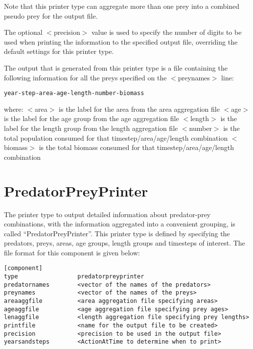 \documentclass[]{book}
\begin{document}
Note that this printer type can aggregate more than one prey into a
combined pseudo prey for the output file.

The optional \(<\)precision\(>\) value is used to specify the number of
digits to be used when printing the information to the specified output
file, overriding the default settings for this printer type.

The output that is generated from this printer type is a file containing
the following information for all the preys specified on the
\(<\)preynames\(>\) line:

\begin{verbatim}
year-step-area-age-length-number-biomass
\end{verbatim}

where: \(<\)area\(>\) is the label for the area from the area aggregation
file \(<\)age\(>\) is the label for the age group from the age aggregation
file \(<\)length\(>\) is the label for the length group from the length
aggregation file \(<\)number\(>\) is the total population consumed for that
timestep/area/age/length combination \(<\)biomass\(>\) is the total biomass
consumed for that timestep/area/age/length combination

\hypertarget{sec:predatorpreyprinter}{%
\section{PredatorPreyPrinter}\label{sec:predatorpreyprinter}}

The printer type to output detailed information about predator-prey
combinations, with the information aggregated into a convenient
grouping, is called ``PredatorPreyPrinter''. This printer type is defined
by specifying the predators, preys, areas, age groups, length groups and
timesteps of interest. The file format for this component is given
below:

\begin{verbatim}
[component]
type                 predatorpreyprinter
predatornames        <vector of the names of the predators>
preynames            <vector of the names of the preys>
areaaggfile          <area aggregation file specifying areas>
ageaggfile           <age aggregation file specifying prey ages>
lenaggfile           <length aggregation file specifying prey lengths>
printfile            <name for the output file to be created>
precision            <precision to be used in the output file>
yearsandsteps        <ActionAtTime to determine when to print>
\end{verbatim}
\end{document}
